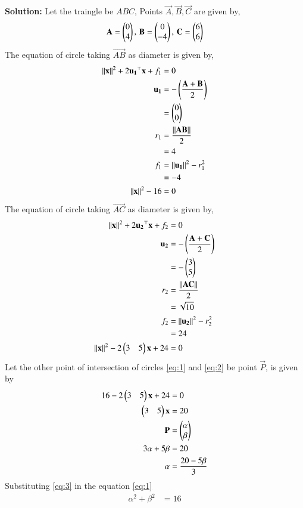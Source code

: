 \documentclass[journal,12pt,twocolumn]{IEEEtran}
\begin{document}
\begin{enumerate}
\textbf{Solution:}
Let the traingle be $ABC$, Points $\vec{A},\vec{B},\vec{C}$ are given by,
\begin{align}
\mathbf{A} = \begin{pmatrix}0\\4\end{pmatrix}, \,\mathbf{B} = \begin{pmatrix}0\\-4\end{pmatrix}, \,\mathbf{C} = \begin{pmatrix}6\\6\end{pmatrix}
\end{align}
The equation of circle taking $\vec{AB}$ as diameter is given by,
\begin{align}
\left\lVert\mathbf{x}\right\rVert^2 + 2\mathbf{u_1}^\top\mathbf{x} + f_1 &= 0 \\
\mathbf{u_1} &= -\left(\frac{\mathbf{A}+\mathbf{B}}{2}\right)\\
&= \begin{pmatrix}0\\0\end{pmatrix}\\
r_1 &= \frac{\left\lVert\mathbf{AB}\right\rVert}{2}\\
&= 4\\
f_1 &= \left\lVert\mathbf{u_1}\right\rVert^2 - r_1^2\\
&= -4\\
\left\lVert\mathbf{x}\right\rVert^2 -16 &= 0
\label{eq:1}
\end{align}
The equation of circle taking $\vec{AC}$ as diameter is given by,
\begin{align}
\left\lVert\mathbf{x}\right\rVert^2 + 2\mathbf{u_2}^\top\mathbf{x} + f_2 &= 0 \\
\mathbf{u_2} &= -\left(\frac{\mathbf{A}+\mathbf{C}}{2}\right)\\
&= -\begin{pmatrix}3\\5\end{pmatrix}\\
r_2 &= \frac{\left\lVert\mathbf{AC}\right\rVert}{2}\\
&= \sqrt{10}\\
f_2 &= \left\lVert\mathbf{u_2}\right\rVert^2 - r_2^2\\
&= 24\\
\left\lVert\mathbf{x}\right\rVert^2 -2\begin{pmatrix}3&5\end{pmatrix}\mathbf{x}+24 &= 0
\label{eq:2}
\end{align}
Let the other point of intersection of circles \eqref{eq:1} and \eqref{eq:2} be point $\vec{P}$, is given by
\begin{align}
16 - 2\begin{pmatrix}3 & 5\end{pmatrix}\mathbf{x}+24&= 0\\
\begin{pmatrix}3&5\end{pmatrix}\mathbf{x} &= 20\\
\mathbf{P} &= \begin{pmatrix}\alpha\\ \beta\end{pmatrix}\\
3\alpha+5\beta &= 20\\
\alpha &= \frac{20-5\beta}{3}
\label{eq:3}
\end{align}
Substituting \eqref{eq:3} in the equation \eqref{eq:1}
\begin{align}
\alpha^2 + \beta^2 &= 16\\

\end{align}
\end{enumerate}
\end{document}

